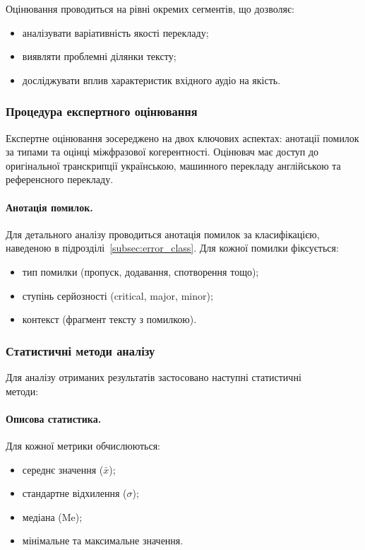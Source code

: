 Оцінювання проводиться на рівні окремих сегментів, що дозволяє:
\begin{itemize}
    \item аналізувати варіативність якості перекладу;
    \item виявляти проблемні ділянки тексту;
    \item досліджувати вплив характеристик вхідного аудіо на якість.
\end{itemize}

\subsubsection{Процедура експертного оцінювання}

Експертне оцінювання зосереджено на двох ключових аспектах: анотації
помилок за типами та оцінці міжфразової когерентності. Оцінювач має
доступ до оригінальної транскрипції українською, машинного перекладу
англійською та референсного перекладу.

\paragraph{Анотація помилок.}
Для детального аналізу проводиться анотація помилок за класифікацією,
наведеною в підрозділі~\ref{subsec:error_class}. Для кожної помилки фіксується:
\begin{itemize}
    \item тип помилки (пропуск, додавання, спотворення тощо);
    \item ступінь серйозності (critical, major, minor);
    \item контекст (фрагмент тексту з помилкою).
\end{itemize}

\subsubsection{Статистичні методи аналізу}

Для аналізу отриманих результатів застосовано наступні статистичні \\методи:

\paragraph{Описова статистика.}
Для кожної метрики обчислюються:
\begin{itemize}
    \item середнє значення ($\bar{x}$);
    \item стандартне відхилення ($\sigma$);
    \item медіана (Me);
    \item мінімальне та максимальне значення.
\end{itemize}

